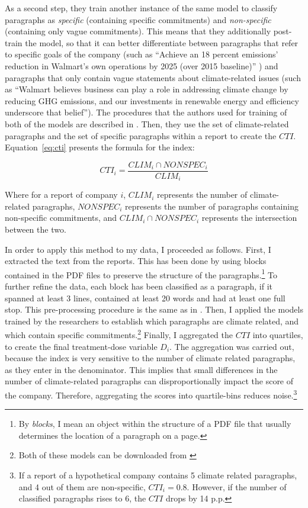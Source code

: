 \documentclass[12pt]{article}
\begin{document}
As a second step, they train another instance of the same model to classify paragraphs as \textit{specific} (containing specific commitments) and \textit{non-specific} (containing only vague commitments). This means that they additionally post-train the model, so that it can better differentiate between paragraphs that refer to specific goals of the company (such as ``Achieve an 18 percent emissions' reduction in Walmart's own operations by 2025 (over 2015 baseline)'' \parencite{walmart2018csr}) and paragraphs that only contain vague statements about climate-related issues (such as ``Walmart believes business can play a role in addressing climate change by reducing GHG emissions, and our investments in renewable energy and efficiency underscore that belief''). The procedures that the authors used for training of both of the models are described in \textcite{binglerCheapTalkCherrypicking2022,binglerHowCheapTalk2024}. Then, they use the set of climate-related paragraphs and the set of specific paragraphs within a report to create the $CTI$. Equation~\ref{eq:cti} presents the formula for the index:

\begin{equation}\label{eq:cti}
    CTI_i = \frac{CLIM_i \cap NONSPEC_i}{CLIM_{i}}
\end{equation}

Where for a report of company $i$, $CLIM_i$ represents the number of climate-related paragraphs, $NONSPEC_i$ represents the number of paragraphs containing non-specific commitments, and $CLIM_i \cap NONSPEC_i$ represents the intersection between the two. 


In order to apply this method to my data, I proceeded as follows. First, I extracted the text from the reports. This has been done by using blocks contained in the PDF files to preserve the structure of the paragraphs.\footnote{By \textit{blocks}, I mean an object within the structure of a PDF file that usually determines the location of a paragraph on a page.} To further refine the data, each block has been classified as a paragraph, if it spanned at least 3 lines, contained at least 20 words and had at least one full stop. This pre-processing procedure is the same as in \textcite{binglerHowCheapTalk2024}. Then, I applied the models trained by the researchers to establish which paragraphs are climate related, and which contain specific commitments.\footnote{Both of these models can be downloaded from \href{https://huggingface.co/climatebert}{}} Finally, I aggregated the $CTI$ into quartiles, to create the final treatment-dose variable $D_i$. The aggregation was carried out, because the index is very sensitive to the number of climate related paragraphs, as they enter in the denominator. This implies that small differences in the number of climate-related  paragraphs can disproportionally impact the score of the company. Therefore, aggregating the scores into quartile-bins reduces noise.\footnote{If a report of a hypothetical company contains 5 climate related paragraphs, and 4 out of them are non-specific, $CTI_i=0.8$. However, if the number of classified paragraphs rises to 6, the $CTI$ drops by 14 p.p.}
\end{document}
